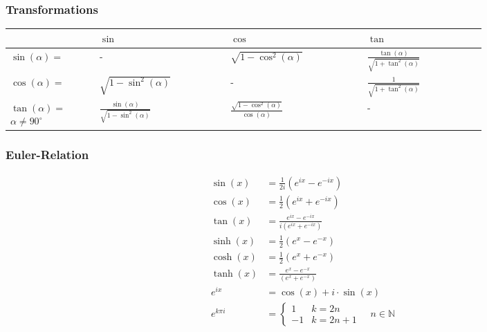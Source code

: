 \subsubsection{Transformations}
\begin{tabular}{ m{0.15\linewidth} | m{0.22\linewidth} | m{0.23\linewidth} | m{0.2\linewidth} } %
                                                    & $\sin$                                         & $\cos$                                         & $\tan$                                         \\
    \hline{} %
    $\sin(\alpha)=$                                 & -                                              & $\sqrt{1-\cos^2(\alpha)}$                      & $\frac{\tan(\alpha)}{\sqrt{1+\tan^2(\alpha)}}$ \\
    \hline{} %
    $\cos(\alpha)=$                                 & $\sqrt{1-\sin^2(\alpha)}$                      & -                                              & $\frac{1}{\sqrt{1+\tan^2(\alpha)}}$            \\
    \hline{} %
    $\tan(\alpha)=$ \newline $\alpha \neq 90^\circ$ & $\frac{\sin(\alpha)}{\sqrt{1-\sin^2(\alpha)}}$ & $\frac{\sqrt{1-\cos^2(\alpha)}}{\cos(\alpha)}$ & -
\end{tabular}

\subsubsection{Euler-Relation}
\begin{align*}
    \sin(x)    & =\frac{1}{2i}(e^{ix}-e^{-ix})             \\
    \cos(x)    & =\frac{1}{2}(e^{ix}+e^{-ix})              \\
    \tan(x)    & =\frac{e^{ix}-e^{-ix}}{i(e^{ix}+e^{-ix})} \\
    \sinh(x)   & =\frac{1}{2}(e^{x}-e^{-x})                \\
    \cosh(x)   & =\frac{1}{2}(e^{x}+e^{-x})                \\
    \tanh(x)   & =\frac{e^{x}-e^{-x}}{(e^{x}+e^{-x})}      \\
    e^{ix}     & = \cos(x) + i \cdot \sin(x)               \\
    e^{k\pi i} & = \begin{cases}
                       1  & k = 2n     \\
                       -1 & k = 2n + 1
                   \end{cases} \quad n \in \mathbb{N}
\end{align*}


